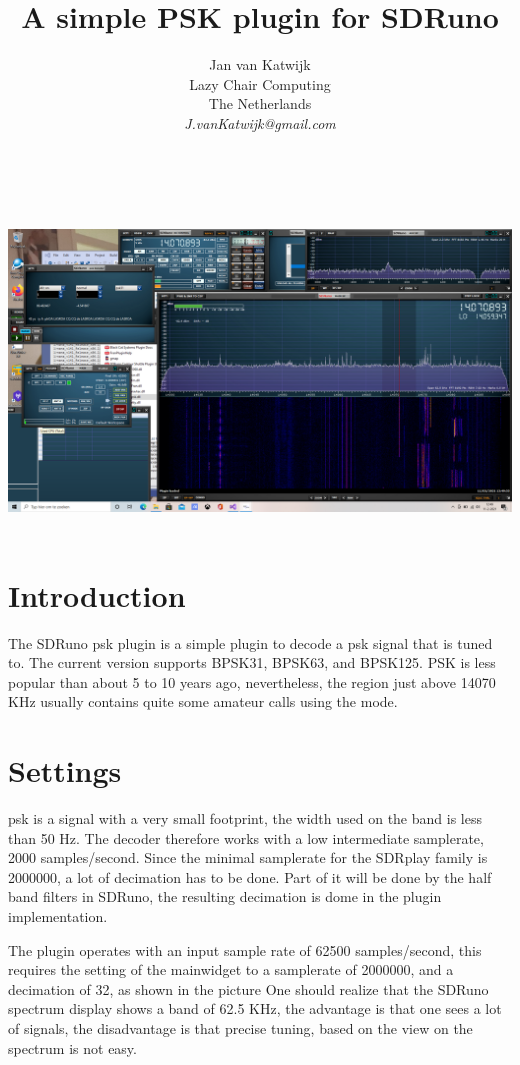 \documentclass[11pt]{article}
\begin{document}
\title{A simple PSK plugin for SDRuno}
\author{
Jan van Katwijk\\
Lazy Chair Computing \\
The Netherlands\\
{\em J.vanKatwijk@gmail.com}}
\maketitle
\ \\
\ \\
\includegraphics[width=160mm]{psk-example.png}
\ \\
\section{Introduction}
The SDRuno psk plugin is a simple plugin to decode a psk signal that
is tuned to. The current version supports BPSK31, BPSK63, and BPSK125.
PSK is less popular than about 5 to 10 years ago, nevertheless, the region
just above 14070 KHz usually contains quite some amateur calls using the
mode.

\section{Settings}
psk is a signal with a very small footprint, the width used on the band is
less than 50 Hz. The decoder therefore works with a low
 intermediate samplerate,  2000 samples/second.
Since the minimal samplerate for the
SDRplay family is 2000000, a lot of decimation has to be done.
Part of it will be done by the half band filters in SDRuno, the resulting
decimation is dome in the plugin implementation.
\par
The plugin operates with an input sample rate of 62500 samples/second,
this requires the setting of the mainwidget to a samplerate of 2000000,
and a decimation of 32, as shown in the picture
One should realize that the SDRuno spectrum display shows a band of 62.5
KHz, the advantage is that one sees a lot of signals, the disadvantage
is that precise tuning, based on the view on the spectrum is not easy.
\end{document}
